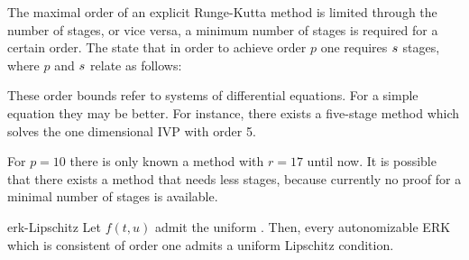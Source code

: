 \begin{remark}
  The maximal order of an explicit Runge-Kutta method is limited
  through the number of stages, or vice versa, a minimum number of
  stages is required for a certain order. The  state
  that in order to achieve order $p$ one requires $s$ stages, where
  $p$ and $s$ relate as follows:
  \begin{center}
    
  \end{center}
  
  These order bounds refer to systems of differential equations.  For
  a simple equation they may be better. For instance, there exists a
  five-stage method which solves the one dimensional IVP with order 5.

  For $p = 10$ there is only known a method with $r = 17$ until now.
  It is possible that there exists a method that needs less stages,
  because currently no proof for a minimal number of stages is
  available.
\end{remark}

\begin{Lemma}{erk-Lipschitz}
  Let $f(t,u)$ admit the uniform . Then,
  every autonomizable ERK which is consistent of order one admits a
  uniform Lipschitz condition.
\end{Lemma}

